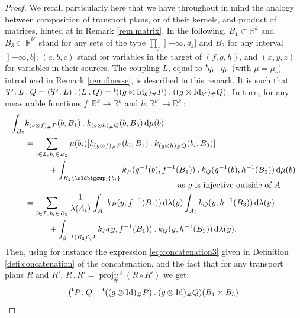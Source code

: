 \documentclass[JEP,XML,SOM,Unicode,NoEqCountersInSection,NoFloatCountersInSection,published]{cedram}
\newcommand{\ldot}{\mathbin{.}}
\theoremstyle{plain}
\theoremstyle{definition}
\newcommand{\dd}{\mathrm{d}}
\newcommand{\Id}{\operatorname{Id}}
\newcommand{\trans}{{}^{\mathrm{t}}\mkern-1mu}
\newcommand{\la}{\lambda}
\newcommand{\R}{\mathbb{R}}
\newcommand{\pr}{\operatorname{proj}}
\newcommand{\op}{\mathopen}
\begin{document}
\begin{proof} We recall particularly here that we have throughout in mind the analogy between composition of transport plans, or of their kernels, and product of matrices, hinted at in Remark \ref{rem:matrix}. In the following, $B_1\subset\R^k$ and $B_3\subset\R^{k'}$ stand for any sets of the type $\prod_j\op]-\infty,d_j]$ and $B_2$ for any interval $\op]-\infty,b]$; $(a,b,c)$ stand for variables in the target of $(f,g,h)$, and $(x,y,z)$ for variables in their sources. The coupling $L$, equal to $\trans q_r\ldot q_r$ (with $\mu=\mu_r$) introduced in Remark \ref{rem:finesse}, is described in this remark. It is such that $\trans\!P\ldot L\ldot Q=(\trans\!P\ldot L)\ldot(L\ldot Q)=\trans((g\otimes \Id_{k})_\#P)\ldot((g\otimes \Id_{k'})_\#Q)$. In turn, for any measurable functions $f:\R^k\to\R^k$ and $h:\R^{k'}\to\R^{k'}$:\vspace*{-3pt}
\begin{equation}\label{eq:prelim_distributivite}
\begin{aligned}
\int_{B_2}&k_{(g\otimes f)_\#P}(b,B_1)\ldot k_{(g \otimes h)_\#Q}(b,B_3)\,\dd\mu(b)\\
&=\sum_{i\in\mathcal{I},\,b_i\in B_2}\mu(b_i)[k_{(g\otimes f)_\#P}(b_i,B_1)\ldot k_{(g\otimes h)_\#Q}(b_i,B_3)]\\
&\hspace*{1cm}+\int_{B_2\setminus\oldbigcup_i\{b_i\}}k_{P}(g^{-1}(b),f^{-1}(B_1))\ldot k_{Q}(g^{-1}(b),h^{-1}(B_3))\,\dd\mu(b)\\[-5pt]
&\hspace*{6.5cm}\text{as $g$ is injective outside of $A$}\\
&=\sum_{i\in \mathcal{I},\,b_i\in B_2}\frac1{\la(A_i)}\int_{A_i}k_{P}(y,f^{-1}(B_1))\,\dd\la(y)\int_{A_i}k_{Q}(y,h^{-1}(B_3))\,\dd\la(y)\\
&\hspace*{1cm}+\int_{g^{-1}(B_2)\setminus A}k_{P}(y,f^{-1}(B_1))\ldot k_{Q}(y,h^{-1}(B_3))\,\dd\la(y).
\end{aligned}
\end{equation}
Then, using for instance the expression \eqref{eq:concatenation3} given in Definition \ref{defi:concatenation} of the concatenation, and the fact that for any transport plans $R$ and $R'$, $R\ldot R'=\pr^{1,3}_\#(R\circ R')$ we get:\vspace*{-3pt}
\begin{align*}
(\trans P\ldot Q&-\trans((g\otimes \Id)_\#P)\ldot(g\otimes \Id)_\#Q)(B_1\times B_3)\\

\end{align*}
\end{proof}
\end{document}
